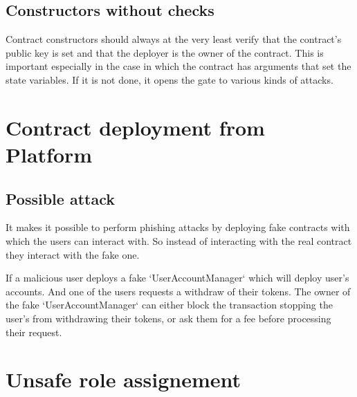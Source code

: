 \subsection{Constructors without checks}
\label{constructor:check}

Contract constructors should always at the very least verify that the contract's public key is set and that the deployer is the owner of the contract. This is important especially in the case in which the contract has arguments that set the state variables. If it is not done, it opens the gate to various kinds of attacks.

\section{Contract deployment from Platform}


\subsection{Possible attack}

It makes it possible to perform phishing attacks by deploying fake contracts with which the users can interact with. So instead of interacting with the real contract they interact with the fake one. 

If a malicious user deploys a fake `UserAccountManager` which will deploy user's accounts. And one of the users requests a withdraw of their tokens. The owner of the fake `UserAccountManager` can either block the transaction stopping the user's from withdrawing their tokens, or ask them for a fee before processing their request.


\section{Unsafe role assignement}

